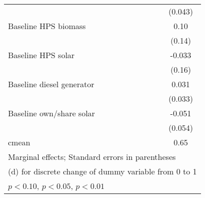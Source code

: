 \begin{table}[htbp]
\begin{tabular*}{1\hsize}{@{\hskip\tabcolsep\extracolsep\fill}l*{5}{c}}
                &                  &                  &                  &                  &  (0.043)         \\
Baseline HPS biomass&                  &                  &                  &                  &     0.10         \\
                &                  &                  &                  &                  &   (0.14)         \\
Baseline HPS solar&                  &                  &                  &                  &   -0.033         \\
                &                  &                  &                  &                  &   (0.16)         \\
Baseline diesel generator&                  &                  &                  &                  &    0.031         \\
                &                  &                  &                  &                  &  (0.033)         \\
Baseline own/share solar&                  &                  &                  &                  &   -0.051         \\
                &                  &                  &                  &                  &  (0.054)         \\
\midrule
cmean           &                  &                  &                  &                  &     0.65         \\
\bottomrule
\multicolumn{6}{l}{\footnotesize Marginal effects; Standard errors in parentheses}\\
\multicolumn{6}{l}{\footnotesize  (d) for discrete change of dummy variable from 0 to 1}\\
\multicolumn{6}{l}{\footnotesize \sym{*} \(p<0.10\), \sym{**} \(p<0.05\), \sym{***} \(p<0.01\)}\\
\end{tabular*}
\end{table}
